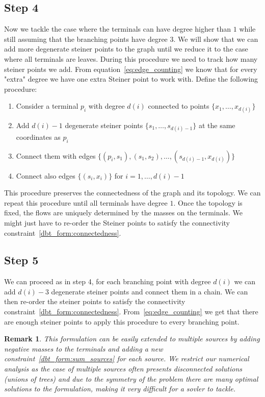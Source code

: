 \documentclass[11pt,reqno,a4paper]{amsart}
\numberwithin{equation}{section}
\theoremstyle{mytheorem}
\theoremstyle{myremark}
\newtheorem{remark}[subsection]{Remark}
\theoremstyle{myparagraph}
\begin{document}
    \subsection{Step 4}
    Now we tackle the case where the terminals can have degree higher than $1$ while still assuming that the branching points have
    degree $3$.
    We will show that we can add more degenerate steiner points to the graph until we reduce it to the case where all terminals are leaves.
    During this procedure we need to track how many steiner points we add.
    From equation~\ref{eq:edge_counting} we know that for every "extra" degree we have one extra Steiner point to work with.
    Define the following procedure:
    \begin{enumerate}
        \item Consider a terminal $p_i$ with degree $d(i)$ connected to points $\{x_1, \dots, x_{d(i)}\}$
        \item Add $d(i) - 1$ degenerate steiner points $\{s_1, \dots, s_{d(i)-1}\}$ at the same coordinates as $p_i$
        \item Connect them with edges $\{ (p_i, s_1), (s_1, s_2), \dots, (s_{d(i)-1}, x_{d(i)}) \}$
        \item Connect also edges $\{ (s_i, x_i) \}$ for $i = 1, \dots, d(i)-1$
    \end{enumerate}
    This procedure preserves the connectedness of the graph and its topology. We can repeat this procedure until all terminals
    have degree $1$.
    Once the topology is fixed, the flows are uniquely determined by the masses on the terminals. We might just have to
    re-order the Steiner points to satisfy the connectivity constraint~\ref{dbt_form:connectedness}.

    \subsection{Step 5}

    We can proceed as in step 4, for each branching point with degree $d(i)$ we can add $d(i) - 3$ degenerate steiner points
    and connect them in a chain. We can then re-order the steiner points to satisfy the connectivity constraint~\ref{dbt_form:connectedness}.
    From~\ref{eq:edge_counting} we get that there are enough steiner points to apply this procedure to every branching point.

    \begin{remark}
        This formulation can be easily extended to multiple sources by adding negative masses to the terminals and adding a new
        constraint~\ref{dbt_form:sum_sources} for each source.
        We restrict our numerical analysis as the case of multiple sources often presents disconnected solutions (unions of trees)
        and due to the symmetry of the problem there are many optimal solutions to the formulation, making it very difficult for a sovler to
        tackle.
    \end{remark}
\end{document}
